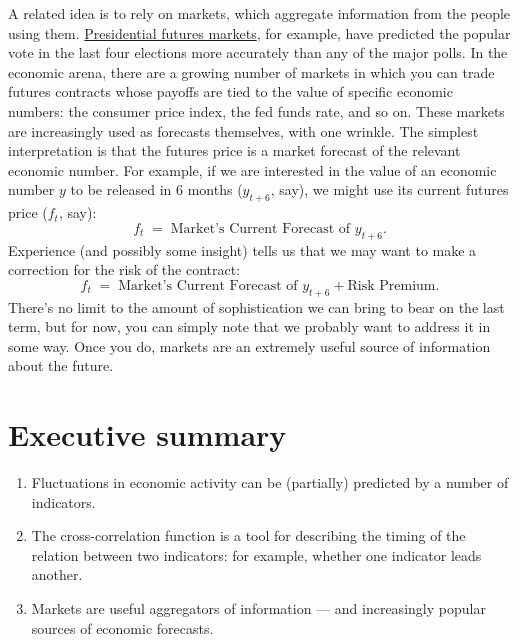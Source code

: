A related idea is to rely on markets, which aggregate information
from the people using them.  \href{http://tippie.uiowa.edu/iem/markets/pres12.html}{Presidential futures markets}, for
example, have predicted the popular vote in the last four
elections more accurately than any of the major polls.
In the economic arena, there are a growing number of markets
in which you can trade futures contracts whose payoffs are tied
to the value of specific economic numbers:
the consumer price index, the fed funds rate, and so on.
These markets are increasingly used as forecasts themselves, with one wrinkle.
The simplest interpretation is that the futures price is a market forecast
of the relevant economic number.
For example, if we are interested in the value of an economic number $y$
to be released in 6 months ($y_{t+6}$, say),
we might use its current futures price ($f_t$, say):
\[
    f_t  \;=\;  \mbox{Market's Current Forecast of } y_{t+6} .
\]
Experience (and possibly some insight) tells us that we may want to make a
correction for the risk of the contract:
\[
    f_t  \;=\;  \mbox{Market's Current Forecast of } y_{t+6}
                + \mbox{Risk Premium} .
\]
There's no limit to the amount of sophistication
we can bring to bear on the last term,
but for now, you can simply note that
we probably want to address it in some way.
Once you do, markets are an extremely useful source of information
about the future.


\section*{Executive summary}

\setlength{\leftmargini}{.5\oldleftmargini}
\begin{enumerate}
\item Fluctuations in economic activity can be (partially)
predicted by a number of indicators.

\item The cross-correlation function is a tool for describing the
timing of the relation between two indicators:
for example, whether one indicator leads another.

\item Markets are useful aggregators of information --- and increasingly popular sources of economic forecasts.
\end{enumerate}
\setlength{\leftmargini}{\oldleftmargini}

